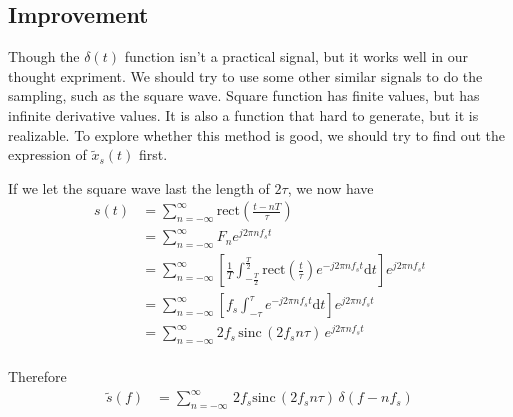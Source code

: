 \documentclass{article}
\begin{document}
\subsection{Improvement}

Though the $\delta (t)$ function isn't a practical signal, but it works well in our thought expriment. We should try to use some other similar signals to do the sampling, such as the square wave. Square function has finite values, but has infinite derivative values. It is also a function that hard to generate, but it is realizable. To explore whether this method is good, we should try to find out the expression of $\widetilde{x}_s(t)$ first.

If we let the square wave last the length of $2\tau$, we now have
\begin{equation}
    \begin{aligned}
        s(t) & = \sum_{n = -\infty}^{\infty} \mathrm{rect} (\frac{t - nT}{\tau})                                                                                                    \\
             & = \sum_{n = -\infty}^{\infty}F_n e^{j2 \pi n f_s t}                                                                                                                  \\
             & = \sum_{n = -\infty}^{\infty}\left[ \frac{1}{T} \int_{-\frac T2}^{\frac T2} \mathrm{rect}(\frac{t}{\tau}) e^{-j2 \pi n f_s t} \mathrm{d}t \right] e^{j2 \pi n f_s t} \\
             & = \sum_{n = -\infty}^{\infty}\left[ f_s \int_{-\tau}^{\tau} e^{-j2 \pi n f_s t} \mathrm{d}t \right] e^{j2 \pi n f_s t}                                               \\
             & = \sum_{n = -\infty}^{\infty}2f_s\, \mathrm{sinc} \,( 2f_s n\tau)\, e^{j2 \pi n f_s t} \label{rect_st}                                                               \\
    \end{aligned}
\end{equation}

Therefore
\begin{equation}
    \begin{aligned}
        \widetilde{s}(f) & = \sum_{n = -\infty}^{\infty}\, 2f_s \mathrm{sinc}\, ( 2f_s n\tau)\, \delta(f - nf_s) \\
    \end{aligned}
\end{equation}
\end{document}
